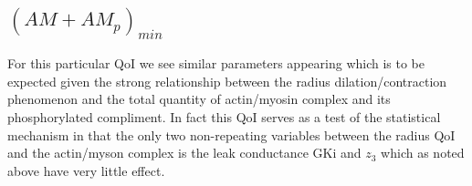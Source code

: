 \subsection{$(AM+AM_p)_{min}$}
For this particular QoI we see similar parameters appearing which is to be expected given the strong relationship between the radius dilation/contraction phenomenon and the total quantity of actin/myosin complex and its phosphorylated compliment. In fact this QoI serves as a test of the statistical mechanism in that the only two non-repeating variables between the radius QoI and the actin/myson complex is the leak conductance GKi and $z_3$ which as noted above have very little effect. 

